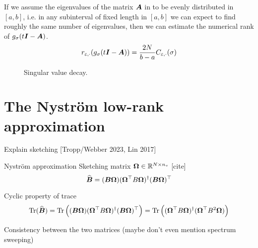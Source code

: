 If we assume the eigenvalues of the matrix $\boldsymbol{A}$ in 
to be evenly distributed in $[a, b]$, i.e. in any subinterval of fixed length in
$[a, b]$ we can expect to find roughly the same number of eigenvalues, then
we can estimate the numerical rank of $g_{\sigma}(t\boldsymbol{I} - \boldsymbol{A})$.
\begin{equation}
    r_{\varepsilon, \cdot}(g_{\sigma}(t\boldsymbol{I} - \boldsymbol{A})) = \frac{2 N}{b - a} C_{\varepsilon, \cdot}(\sigma)
\end{equation}

\begin{figure}[ht]
    \centering
    \caption{Singular value decay.}
    \label{fig:3-nystrom-singular-value-decay}
\end{figure}


\section{The Nystr\"om low-rank approximation}
\label{sec:3-nystrom-nystrom}

Explain sketching [Tropp/Webber 2023, Lin 2017]

Nyström approximation \cite{gittens2013nystrom}
Sketching matrix $\boldsymbol{\Omega} \in \mathbb{R}^{N \times n_v}$ [cite]
\begin{equation}
    \widehat{\boldsymbol{B}} = (\boldsymbol{B} \boldsymbol{\Omega}) (\boldsymbol{\Omega}^{\top} B \boldsymbol{\Omega})^{\dagger} (\boldsymbol{B} \boldsymbol{\Omega})^{\top}
    \label{equ:3-nystrom-SS-nystrom}
\end{equation}

Cyclic property of trace
\begin{equation}
    \operatorname{Tr}(\widehat{\boldsymbol{B}})
        = \operatorname{Tr}\left((\boldsymbol{B} \boldsymbol{\Omega}) (\boldsymbol{\Omega}^{\top} B \boldsymbol{\Omega})^{\dagger} (\boldsymbol{B} \boldsymbol{\Omega})^{\top} \right)
        = \operatorname{Tr}\left((\boldsymbol{\Omega}^{\top} B \boldsymbol{\Omega})^{\dagger} (\boldsymbol{\Omega}^{\top} B^2 \boldsymbol{\Omega}) \right)
    \label{equ:3-nystrom-SS-nystrom-trace}
\end{equation}

Consistency between the two matrices (maybe don't even mention spectrum sweeping)

